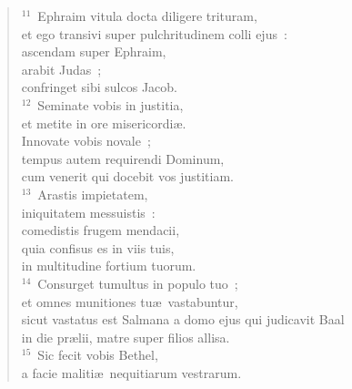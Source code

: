 \begin{verse}
${}^{11}$~Ephraim vitula docta diligere trituram,\\ et ego transivi super pulchritudinem colli ejus~:\\ ascendam super Ephraim,\\ arabit Judas~;\\ confringet sibi sulcos Jacob.\\
${}^{12}$~Seminate vobis in justitia,\\ et metite in ore misericordi\ae .\\ Innovate vobis novale~;\\ tempus autem requirendi Dominum,\\ cum venerit qui docebit vos justitiam.\\
${}^{13}$~Arastis impietatem,\\ iniquitatem messuistis~:\\ comedistis frugem mendacii,\\ quia confisus es in viis tuis,\\ in multitudine fortium tuorum.\\
${}^{14}$~Consurget tumultus in populo tuo~;\\ et omnes munitiones tu\ae\ vastabuntur,\\ sicut vastatus est Salmana a domo ejus qui judicavit Baal\\ in die pr\ae lii, matre super filios allisa.\\
${}^{15}$~Sic fecit vobis Bethel,\\ a facie maliti\ae\ nequitiarum vestrarum.\end{verse}


